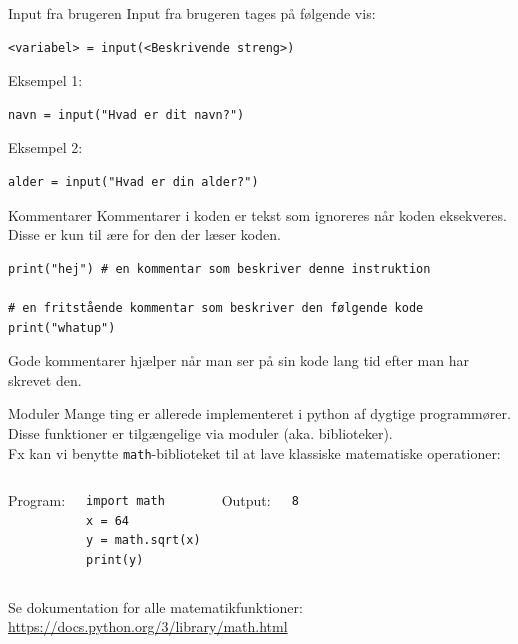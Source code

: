 \documentclass[10pt]{beamer}
\begin{document}
\begin{frame}[fragile]{Input fra brugeren}
	Input fra brugeren tages på følgende vis:
	\begin{lstlisting}[style=python]
<variabel> = input(<Beskrivende streng>)
	\end{lstlisting}
	Eksempel 1:
	\begin{lstlisting}[style=python]
navn = input("Hvad er dit navn?")
	\end{lstlisting}
	Eksempel 2:
	\begin{lstlisting}[style=python]
alder = input("Hvad er din alder?")
	\end{lstlisting}
\end{frame}

\begin{frame}[fragile]{Kommentarer}
	Kommentarer i koden er tekst som ignoreres når koden eksekveres. Disse er kun til ære for den der læser koden.
	\begin{lstlisting}[style=python]
print("hej") # en kommentar som beskriver denne instruktion

# en fritstående kommentar som beskriver den følgende kode
print("whatup")
	\end{lstlisting}
	Gode kommentarer hjælper når man ser på sin kode lang tid efter man har skrevet den.
\end{frame}

\begin{frame}[fragile]{Moduler}
	Mange ting er allerede implementeret i python af dygtige programmører.
	Disse funktioner er tilgængelige via moduler (aka. biblioteker). \\
	Fx kan vi benytte \texttt{math}-biblioteket til at lave klassiske matematiske operationer:

	\bigskip
	\begin{columns}
		Program:
		\begin{lstlisting}[style=python]
import math
x = 64
y = math.sqrt(x)
print(y)
		\end{lstlisting}
		Output:
		\begin{lstlisting}[style=python]
8
		\end{lstlisting}
	\end{columns}


	Se dokumentation for alle matematikfunktioner:
	\url{https://docs.python.org/3/library/math.html}
\end{frame}

\end{document}

